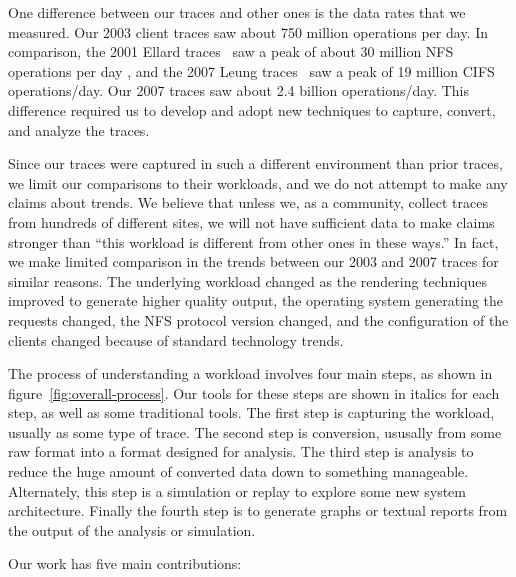 One difference between our traces and other ones is the data rates
that we measured.  Our 2003 client traces saw about 750 million
operations per day.  In comparison, the 2001 Ellard
traces~\cite{EllardFast03} saw a peak of about 30 million NFS
operations per day , and the 2007 Leung traces~\cite{LeungUsenix08}
saw a peak of 19 million CIFS operations/day.  Our 2007 traces saw
about 2.4 billion operations/day.  This difference required us to
develop and adopt new techniques to capture, convert, and analyze the
traces.

Since our traces were captured in such a different environment than
prior traces, we limit our comparisons to their workloads, and we
do not attempt to make any claims about trends.  We believe that
unless we, as a community, collect traces from hundreds of different
sites, we will not have sufficient data to make claims stronger than
``this workload is different from other ones in these ways.''  In
fact, we make limited comparison in the trends between our 2003 and
2007 traces for similar reasons.  The underlying workload changed
as the rendering techniques improved to generate higher quality output,
the operating system generating the requests changed, the NFS
protocol version changed, and the configuration of the clients 
changed because of standard technology trends.

The process of understanding a workload involves four main
steps, as shown in figure~\ref{fig:overall-process}.  Our tools for
these steps are shown in italics for each step, as well as some
traditional tools.  The first step is capturing the workload, usually
as some type of trace.  The second step is conversion, ususally from
some raw format into a format designed for analysis.  The third step
is analysis to reduce the huge amount of converted data down to
something manageable.  Alternately, this step is a simulation or replay to
explore some new system architecture.  Finally the fourth step is to
generate graphs or textual reports from the output of the analysis or
simulation.

Our work has five main contributions:

